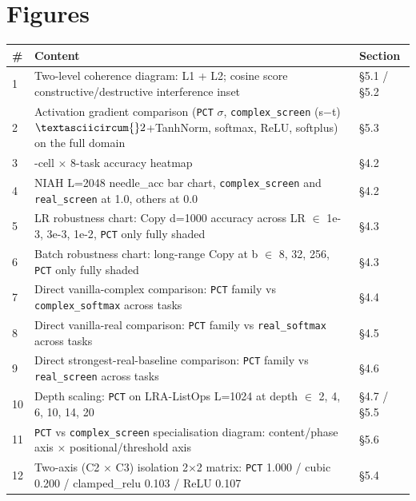 \documentclass[11pt,a4paper]{article}
\theoremstyle{plain}
\theoremstyle{definition}
\begin{document}
\section*{Figures}
\begin{table}[H]
\centering
\footnotesize
\setlength{\tabcolsep}{4pt}
\renewcommand{\arraystretch}{1.1}
\begin{tabularx}{\textwidth}{|l|>{\raggedright\arraybackslash}X|l|}
\hline
\# & Content & Section \\
\hline
1 & Two-level coherence diagram: L1 + L2; cosine score constructive/destructive interference inset & \S{}5.1 / \S{}5.2 \\
\hline
2 & Activation gradient comparison (\texttt{PCT} $\sigma$, \texttt{complex\_screen} (s$-$t)$\textasciicircum{}2$+TanhNorm, softmax, ReLU, softplus) on the full domain & \S{}5.3 \\
\hline
3 & 6-cell $\times$ 8-task accuracy heatmap & \S{}4.2 \\
\hline
4 & NIAH L=2048 needle\_acc bar chart, \texttt{complex\_screen} and \texttt{real\_screen} at 1.0, others at 0.0 & \S{}4.2 \\
\hline
5 & LR robustness chart: Copy d=1000 accuracy across LR $\in$ {1e-3, 3e-3, 1e-2}, \texttt{PCT} only fully shaded & \S{}4.3 \\
\hline
6 & Batch robustness chart: long-range Copy at b $\in$ {8, 32, 256}, \texttt{PCT} only fully shaded & \S{}4.3 \\
\hline
7 & Direct vanilla-complex comparison: \texttt{PCT} family vs \texttt{complex\_softmax} across tasks & \S{}4.4 \\
\hline
8 & Direct vanilla-real comparison: \texttt{PCT} family vs \texttt{real\_softmax} across tasks & \S{}4.5 \\
\hline
9 & Direct strongest-real-baseline comparison: \texttt{PCT} family vs \texttt{real\_screen} across tasks & \S{}4.6 \\
\hline
10 & Depth scaling: \texttt{PCT} on LRA-ListOps L=1024 at depth $\in$ {2, 4, 6, 10, 14, 20} & \S{}4.7 / \S{}5.5 \\
\hline
11 & \texttt{PCT} vs \texttt{complex\_screen} specialisation diagram: content/phase axis $\times$ positional/threshold axis & \S{}5.6 \\
\hline
12 & Two-axis (C2 $\times$ C3) isolation 2$\times$2 matrix: \texttt{PCT} 1.000 / cubic 0.200 / clamped\_relu 0.103 / ReLU 0.107 & \S{}5.4 \\
\hline
\end{tabularx}
\end{table}
\end{document}
